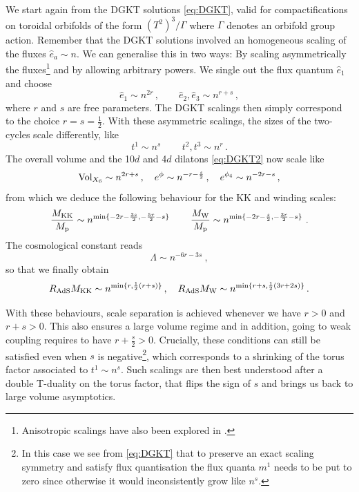 \documentclass[11pt, a4paper]{article}
\newcommand{\MK}{M_{\rm KK}}
\newcommand{\MW}{M_{\rm W}}
\newcommand{\Mp}{M_{\rm p}}
\newcommand{\Rads}{R_{\rm AdS}}
\newcommand{\half}{\frac{1}{2}}
\begin{document}
We start again from the DGKT solutions \eqref{eq:DGKT}, valid for compactifications on toroidal orbifolds of the form $(T^2)^3/\Gamma$ where $\Gamma$ denotes an orbifold group action. Remember that the DGKT solutions involved an homogeneous scaling of the fluxes $\hat e_a\sim n$. We can generalise this in two ways: By scaling asymmetrically the fluxes\footnote{Anisotropic scalings have also been explored in \cite{Tringas:2023vzn}.} and by allowing arbitrary powers. We single out the flux quantum $\hat e_1$ and choose
\begin{equation}
\hat e_1\sim n^{2r}\, ,\qquad\hat e_2,\hat e_3\sim n^{r+s}\, ,
\end{equation}
%
where $r$ and $s$ are free parameters. The DGKT scalings then simply correspond to the choice $r=s=\half$. With these asymmetric scalings, the sizes of the two-cycles scale differently, like
\begin{equation}
\label{eq:scalings_gen}
t^1\sim n^s\, \qquad t^2,t^3\sim n^r\, .    
\end{equation}
%
The overall volume and the 10$d$ and 4$d$ dilatons \eqref{eq:DGKT2} now scale like
\begin{equation}
{\rm Vol}_{X_6}\sim n^{2r+s}\, ,\quad e^\phi\sim n^{-r-\frac{s}{2}}\, ,\quad e^{\phi_4}\sim n^{-2r-s}\, ,
\end{equation}
%
from which we deduce the following behaviour for the KK and winding scales:
\begin{equation}
\frac{\MK}{\Mp}\sim n^{\min\{-2r-\frac{3s}{2},-\frac{5r}{2}-s\}}\, \qquad \frac{\MW}{\Mp}\sim n^{\min\{-2r-\frac{s}{2},-\frac{3r}{2}-s\}}\ .
\end{equation}
%
The cosmological constant reads
\begin{equation}
\Lambda\sim n^{-6r-3s}\ ,    
\end{equation}
%
so that we finally obtain
\begin{equation}
\Rads\MK\sim n^{\min\{r,\half(r+s)\}}\, ,\quad\Rads\MW\sim n^{\min\{r+s,\half(3r+2s)\}}\, .
\end{equation}

With these behaviours, scale separation is achieved whenever we have $r>0$ and $r+s>0$. This also ensures a large volume regime and in addition, going to weak coupling requires to have $r+\frac{s}{2}>0$. Crucially, these conditions can still be satisfied even when $s$ is negative\footnote{In this case we see from \eqref{eq:DGKT} that to preserve an exact scaling symmetry and satisfy flux quantisation the flux quanta $m^1$ needs to be put to zero since otherwise it would inconsistently grow like $n^s$.}, which corresponds to a shrinking of the torus factor associated to $t^1\sim n^s$. Such scalings are then best understood after a double T-duality on the torus factor, that flips the sign of $s$ and brings us back to large volume asymptotics.
\end{document}
